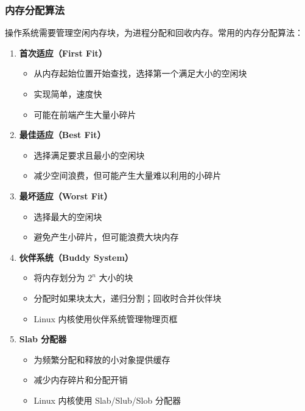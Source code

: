 \subsubsection{内存分配算法}

操作系统需要管理空闲内存块，为进程分配和回收内存。常用的内存分配算法：

\begin{enumerate}
  \item \textbf{首次适应（First Fit）}
    \begin{itemize}
      \item 从内存起始位置开始查找，选择第一个满足大小的空闲块
      \item 实现简单，速度快
      \item 可能在前端产生大量小碎片
    \end{itemize}

  \item \textbf{最佳适应（Best Fit）}
    \begin{itemize}
      \item 选择满足要求且最小的空闲块
      \item 减少空间浪费，但可能产生大量难以利用的小碎片
    \end{itemize}

  \item \textbf{最坏适应（Worst Fit）}
    \begin{itemize}
      \item 选择最大的空闲块
      \item 避免产生小碎片，但可能浪费大块内存
    \end{itemize}

  \item \textbf{伙伴系统（Buddy System）}
    \begin{itemize}
      \item 将内存划分为 $2^n$ 大小的块
      \item 分配时如果块太大，递归分割；回收时合并伙伴块
      \item Linux 内核使用伙伴系统管理物理页框
    \end{itemize}

  \item \textbf{Slab 分配器}
    \begin{itemize}
      \item 为频繁分配和释放的小对象提供缓存
      \item 减少内存碎片和分配开销
      \item Linux 内核使用 Slab/Slub/Slob 分配器
    \end{itemize}
\end{enumerate}

